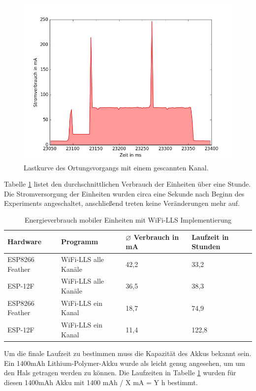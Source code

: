 \begin{figure}[h!]
  \centering
	\includegraphics[width=\textwidth]{plots/wifills1chsend.png}
  \caption{Lastkurve des Ortungsvorgangs mit einem gescannten Kanal.}
  \label{fig:wifills1chsend}
\end{figure}

Tabelle \ref{table:wifillsina} listet den durchschnittlichen Verbrauch der Einheiten über eine Stunde.
Die Stromversorgung der Einheiten wurden circa eine Sekunde nach Beginn des Experiments angeschaltet, anschließend treten keine Veränderungen mehr auf.

\begin{table}[h!]
	\centering
	\caption{Energieverbrauch mobiler Einheiten mit WiFi-LLS Implementierung}
	\label{table:wifillsina}
	\begin{tabular}{p{3.5cm}|p{5cm}|p{2.5cm}|p{2.5cm}}
		Hardware & Programm & $\varnothing$ Verbrauch in mA & Laufzeit in Stunden\\
		\hline
		ESP8266 Feather & WiFi-LLS alle Kanäle & 42,2 & 33,2\\
		ESP-12F & WiFi-LLS alle Kanäle & 36,5 & 38,3\\
		ESP8266 Feather & WiFi-LLS ein Kanal & 18,7 & 74,9\\
		ESP-12F & WiFi-LLS ein Kanal & 11,4 & 122,8\\
	\end{tabular}
\end{table}

Um die finale Laufzeit zu bestimmen muss die Kapazität des Akkus bekannt sein.
Ein 1400mAh Lithium-Polymer-Akku wurde als leicht genug angesehen, um um den Hals getragen werden zu können.
Die Laufzeiten in Tabelle \ref{table:wifillsina} wurden für diesen 1400mAh Akku mit 1400 mAh / X mA = Y h bestimmt.



